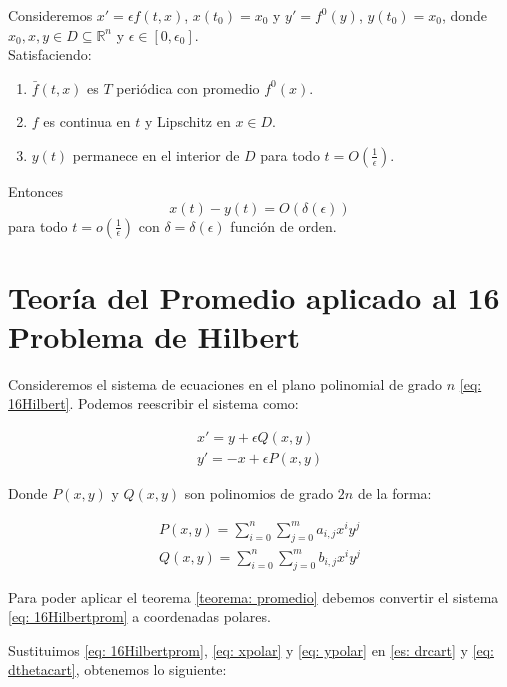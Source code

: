 \begin{theorem}\label{teorema: promedio}
	Consideremos $x'=\epsilon f(t,x)$, $x(t_0)=x_0$ y $y'=f^0(y)$, $y(t_0)=x_0$,
	donde $x_0,x,y\in D\subseteq\mathbb{R}^n$ y $\epsilon\in[0,\epsilon_0]$.\\

	Satisfaciendo:
	\begin{enumerate}
		\item $\bar{f}(t,x)$ es $T$ periódica con promedio $f^0(x)$.
		\item $f$ es continua en $t$ y Lipschitz en $x\in D$.
		\item $y(t)$ permanece en el interior de $D$ para todo $t=O(\frac{1}{\epsilon})$.
	\end{enumerate}
	Entonces
	\[x(t)-y(t)=O(\delta(\epsilon))\]
	para todo $t=o(\frac{1}{\epsilon})$ con $\delta=\delta(\epsilon)$ función de orden.
\end{theorem}

\section{Teoría del Promedio aplicado al 16 Problema de Hilbert}

Consideremos el sistema de ecuaciones en el plano polinomial de grado $n$ \eqref{eq: 16Hilbert}. Podemos reescribir el sistema como:

\begin{equation}\label{eq: 16Hilbertprom}
	\begin{matrix}
		x'=y + \epsilon Q(x,y) \\
		y'= -x + \epsilon P(x,y)
	\end{matrix}
\end{equation}

Donde $P(x,y)$ y $Q(x,y)$ son polinomios de grado $2n$ de la forma:

\begin{equation}\label{eq: 16Hilbertprompol}
	\begin{matrix}
		P(x,y) = \sum_{i=0}^{n} \sum_{j=0}^{m} a_{i,j} x^i y^j \\
		Q(x,y) = \sum_{i=0}^{n} \sum_{j=0}^{m} b_{i,j} x^i y^j
	\end{matrix}
\end{equation}

Para poder aplicar el teorema \ref{teorema: promedio} debemos convertir el sistema \eqref{eq: 16Hilbertprom} a coordenadas polares.

Sustituimos \eqref{eq: 16Hilbertprom}, \eqref{eq: xpolar} y \eqref{eq: ypolar} en \eqref{es: drcart} y \eqref{eq: dthetacart}, obtenemos lo siguiente:


